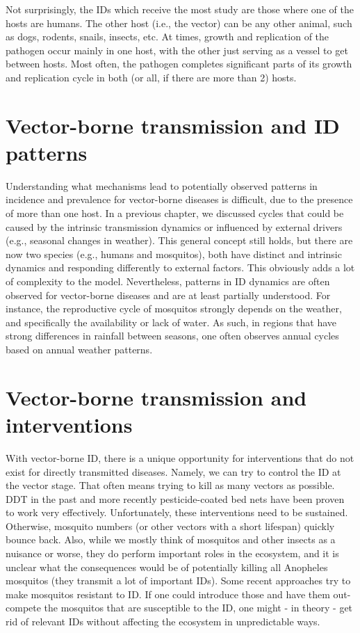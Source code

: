 \documentclass[]{book}
\theoremstyle{definition}
\theoremstyle{definition}
\theoremstyle{definition}
\theoremstyle{remark}
\begin{document}
Not surprisingly, the IDs which receive the most study are those where
one of the hosts are humans. The other host (i.e., the vector) can be
any other animal, such as dogs, rodents, snails, insects, etc. At times,
growth and replication of the pathogen occur mainly in one host, with
the other just serving as a vessel to get between hosts. Most often, the
pathogen completes significant parts of its growth and replication cycle
in both (or all, if there are more than 2) hosts.

\section{Vector-borne transmission and ID
patterns}\label{vector-borne-transmission-and-id-patterns}

Understanding what mechanisms lead to potentially observed patterns in
incidence and prevalence for vector-borne diseases is difficult, due to
the presence of more than one host. In a previous chapter, we discussed
cycles that could be caused by the intrinsic transmission dynamics or
influenced by external drivers (e.g., seasonal changes in weather). This
general concept still holds, but there are now two species (e.g., humans
and mosquitos), both have distinct and intrinsic dynamics and responding
differently to external factors. This obviously adds a lot of complexity
to the model. Nevertheless, patterns in ID dynamics are often observed
for vector-borne diseases and are at least partially understood. For
instance, the reproductive cycle of mosquitos strongly depends on the
weather, and specifically the availability or lack of water. As such, in
regions that have strong differences in rainfall between seasons, one
often observes annual cycles based on annual weather patterns.

\section{Vector-borne transmission and
interventions}\label{vector-borne-transmission-and-interventions}

With vector-borne ID, there is a unique opportunity for interventions
that do not exist for directly transmitted diseases. Namely, we can try
to control the ID at the vector stage. That often means trying to kill
as many vectors as possible. DDT in the past and more recently
pesticide-coated bed nets have been proven to work very effectively.
Unfortunately, these interventions need to be sustained. Otherwise,
mosquito numbers (or other vectors with a short lifespan) quickly bounce
back. Also, while we mostly think of mosquitos and other insects as a
nuisance or worse, they do perform important roles in the ecosystem, and
it is unclear what the consequences would be of potentially killing all
Anopheles mosquitos (they transmit a lot of important IDs). Some recent
approaches try to make mosquitos resistant to ID. If one could introduce
those and have them out-compete the mosquitos that are susceptible to
the ID, one might - in theory - get rid of relevant IDs without
affecting the ecosystem in unpredictable ways.
\end{document}
